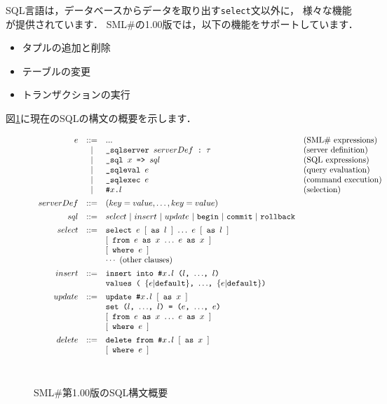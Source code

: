 \documentclass{jbook}
\newcommand{\smlsharp}{SML\#}
\newcommand{\version}{1.00}
\newcommand{\vbar}{\mbox{\ |\ }}
\newcommand{\code}[1]{\mbox{{\tt #1}}}
\begin{document}
	SQL言語は，データベースからデータを取り出す{\tt select}文以外に，
様々な機能が提供されています．
	\smlsharp{}の\version{}版では，以下の機能をサポートしています．
\begin{itemize}
\item タプルの追加と削除
\item テーブルの変更
\item トランザクションの実行
\end{itemize}
	図\ref{fig:sqlSyntax}に現在のSQLの構文の概要を示します．
\begin{figure}
\begin{center}
\[
\begin{array}{rcll}
  e &::=& ... & \mbox{(\smlsharp{} expressions)}
\\  &|& \code{\_sqlserver $serverDef$~:~$\tau$} 
	& \mbox{(server definition)}
\\  &|& \code{\_sql $x$ => $sql$} 
	& \mbox{(SQL expressions)}
\\  &|& \code{\_sqleval $e$}
	& \mbox{(query evaluation)}
\\  &|& \code{\_sqlexec $e$}
	& \mbox{(command execution)}
\\  &|& \code{\#$x$.$l$}
	& \mbox{(selection)}
\\[1ex]
serverDef &::=& (key = value,\ldots,key = value)
\\[1ex]
  sql &::=& select
\vbar insert
\vbar update
\vbar \code{begin}
\vbar \code{commit}
\vbar \code{rollback}
\\[1ex]
select &::=& 
     \code{select $e$ $[$ as $l$ $]$ $\ldots$ $e$ $[$ as $l$ $]$}
\\&& \code{$[$ from $e$ as $x$ $\ldots$ $e$ as $x$ $]$}
\\&& \code{$[$ where $e$ $]$}
\\&& \cdots\ \mbox{(other clauses)}
\\[1ex]
insert &::=& 
\code{insert into \#$x$.$l$ ($l$, $\ldots$, $l$)}
\\&& \code{values ( $\{e|$default$\}$, $\ldots$, $\{e|$default$\}$)}
\\[1ex]
update &::=& 
   \code{update \#$x$.$l$ $[$ as $x$ $]$}
\\&& \code{set ($l$, $\ldots$, $l$) = ($e$, $\ldots$, $e$)}
\\&& \code{$[$ from $e$ as $x$ $\ldots$ $e$ as $x$ $]$}
\\&& \code{$[$ where $e$ $]$}
\\[1ex]
delete &::=& 
   \code{delete from \#$x$.$l$ $[$ as $x$ $]$}
\\&& \code{$[$ where $e$ $]$}
\end{array}
\]
\ \\
\caption{\smlsharp{}第\version{}版のSQL構文概要}
\end{center}
\label{fig:sqlSyntax}
\end{figure}
\end{document}
